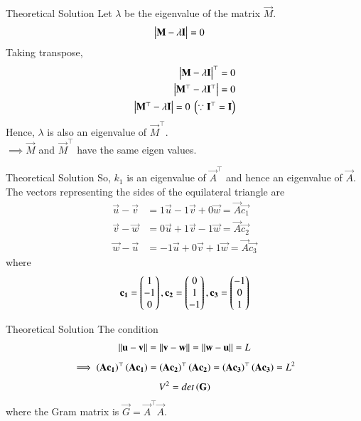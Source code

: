 \documentclass{beamer}
\begin{document}
\begin{frame}{Theoretical Solution}
Let $\lambda$ be the eigenvalue of the matrix $\vec{M}$.
\begin{align}
	\begin{vmatrix}\mathbf{M}-\lambda\mathbf{I}\end{vmatrix} &= 0
\end{align}
Taking transpose,
\begin{align}
	\begin{vmatrix}\mathbf{M}-\lambda\mathbf{I}\end{vmatrix}^\top = 0 \\
	\begin{vmatrix}\mathbf{M}^\top-\lambda\mathbf{I}^\top\end{vmatrix} = 0 \\
	\begin{vmatrix}\mathbf{M}^\top-\lambda\mathbf{I}\end{vmatrix} = 0\text{ }\left(\because \mathbf{I}^\top=\mathbf{I}\right)
\end{align}
Hence, $\lambda$ is also an eigenvalue of $\vec{M}^\top$. \\
$\implies \vec{M}$ and $\vec{M}^\top$ have the same eigen values. \\
\end{frame}

\begin{frame}{Theoretical Solution}
So, $k_1$ is an eigenvalue of $\vec{A}^\top$ and hence an eigenvalue of $\vec{A}$. \\
The vectors representing the sides of the equilateral triangle are
\begin{align}
    \vec{u} - \vec{v} &= 1\vec{u}-1\vec{v}+0\vec{w} = \vec{A}\vec{c_1} \label{eq:1} \\
    \vec{v} - \vec{w} &= 0\vec{u}+1\vec{v}-1\vec{w} = \vec{A}\vec{c_2} \label{eq:2} \\
    \vec{w} - \vec{u} &= -1\vec{u}+0\vec{v}+1\vec{w} = \vec{A}\vec{c_3} \label{eq:3}
\end{align}
where 
\begin{align}
	\mathbf{c_1} = \begin{pmatrix}1 \\ -1 \\ 0\end{pmatrix}, \mathbf{c_2} = \begin{pmatrix}0 \\ 1 \\ -1\end{pmatrix}, \mathbf{c_3} = \begin{pmatrix}-1 \\ 0 \\ 1\end{pmatrix}
\end{align}
\end{frame}

\begin{frame}{Theoretical Solution}
The condition 
\begin{align}
	\left\lVert\mathbf{u} - \mathbf{v}\right\rVert = \left\lVert\mathbf{v} - \mathbf{w}\right\rVert = \left\lVert\mathbf{w} - \mathbf{u}\right\rVert = L
\end{align}
\begin{align}
    \implies \left(\mathbf{A}\mathbf{c_1}\right)^\top\left(\mathbf{A}\mathbf{c_1}\right) = \left(\mathbf{A}\mathbf{c_2}\right)^\top\left(\mathbf{A}\mathbf{c_2}\right) = \left(\mathbf{A}\mathbf{c_3}\right)^\top\left(\mathbf{A}\mathbf{c_3}\right) = L^2 \label{eq:gram}
\end{align}
\begin{align}
    V^2 = det\left(\mathbf{G}\right) 
\end{align}
where the Gram matrix is $\vec{G} = \vec{A}^\top\vec{A}$.
\end{frame}
\end{document}
